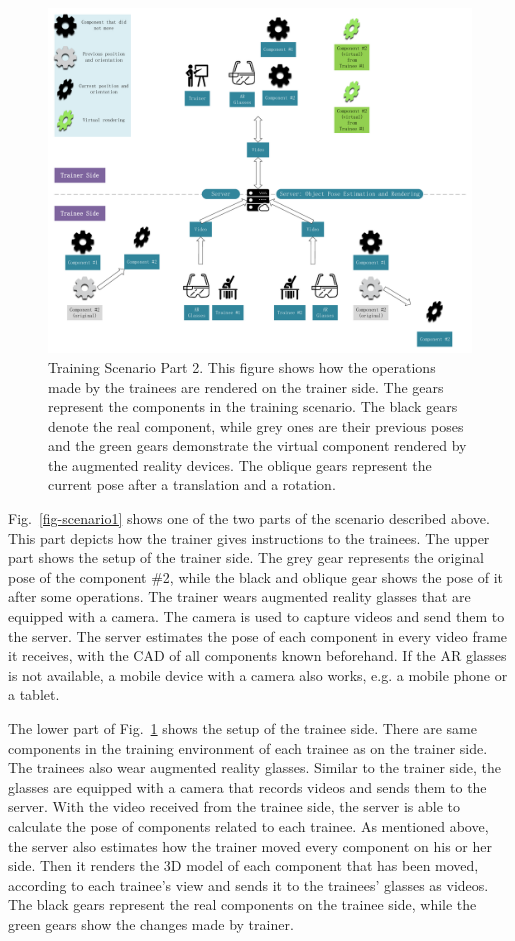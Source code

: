 \begin{figure}
	\centering
	\includegraphics[width=\textwidth]{figures/scenario2.pdf}
	\caption{Training Scenario Part 2. This figure shows how the operations made by the trainees are rendered on the trainer side. The gears represent the components in the training scenario. The black gears denote the real component, while grey ones are their previous poses and the green gears demonstrate the virtual component rendered by the augmented reality devices. The oblique gears represent the current pose after a translation and a rotation.}
	\label{fig-scenario2}
\end{figure}

Fig.~\ref{fig-scenario1} shows one of the two parts of the scenario described above. This part depicts how the trainer gives instructions to the trainees.
The upper part shows the setup of the trainer side. The grey gear represents the original pose of the component  \#2, while the black and oblique gear shows the pose of it after some operations.
The trainer wears augmented reality glasses that are equipped with a camera. The camera is used to capture videos and send them to the server.
The server estimates the pose of each component in every video frame it receives, with the CAD of all components known beforehand.
If the AR glasses is not available, a mobile device with a camera also works, e.g. a mobile phone or a tablet.

The lower part of Fig.~\ref{fig-scenario2} shows the setup of the trainee side.
There are same components in the training environment of each trainee as on the trainer side.
The trainees also wear augmented reality glasses.
Similar to the trainer side, the glasses are equipped with a camera that records videos and sends them to the server. With the video received from the trainee side, the server is able to calculate the pose of components related to each trainee.
As mentioned above, the server also estimates how the trainer moved every component on his or her side. Then it renders the 3D model of each component that has been moved, according to each trainee's view and sends it to the trainees' glasses as videos.
The black gears represent the real components on the trainee side, while the green gears show the changes made by trainer.

